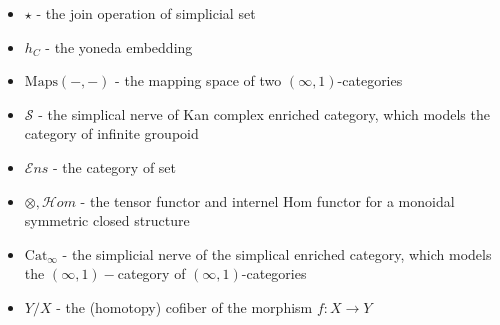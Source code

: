 
\label{chap:symbol}

\begin{itemize}

\item $\star$ - the join operation of simplicial set

\item $h_C$ - the yoneda embedding

\item $\text{Maps}(-,-)$ - the mapping space of two $(\infty,1)$-categories
\item $\mathscr{S}$ - the simplical nerve of Kan complex enriched category, which models the category of infinite groupoid
\item $\mathcal{E}ns$ - the category of set

\item $\otimes,\mathcal{H}om$ - the tensor functor and internel Hom functor for a monoidal symmetric closed structure

\item $\text{Cat}_\infty$ - the simplicial nerve of the simplical enriched category, which models the $(\infty,1)-$category of $(\infty,1)$-categories

\item $Y/X$ - the (homotopy) cofiber of the morphism $f: X\to Y$
\end{itemize}